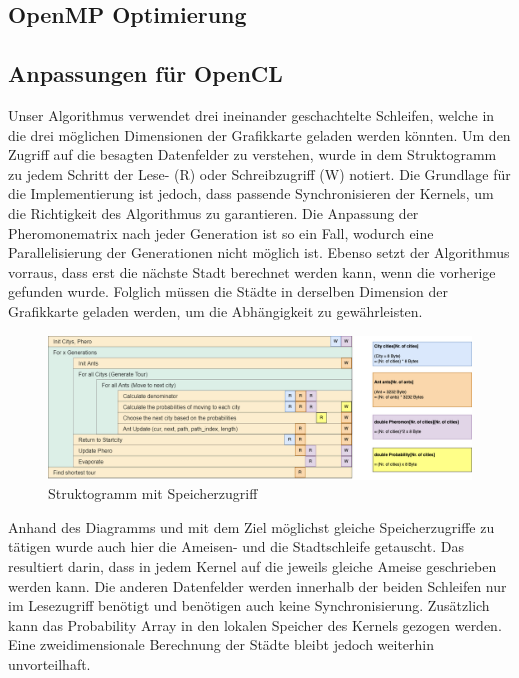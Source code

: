 \subsection*{OpenMP Optimierung}

\subsection*{Anpassungen für OpenCL}

Unser Algorithmus verwendet drei ineinander geschachtelte Schleifen, welche in die drei möglichen Dimensionen der Grafikkarte geladen werden könnten.
Um den Zugriff auf die besagten Datenfelder zu verstehen, wurde in dem Struktogramm zu jedem Schritt der Lese- (R) oder Schreibzugriff (W) notiert.
Die Grundlage für die Implementierung ist jedoch, dass passende Synchronisieren der Kernels, um die Richtigkeit des Algorithmus zu garantieren.
Die Anpassung der Pheromonematrix nach jeder Generation ist so ein Fall, wodurch eine Parallelisierung der Generationen nicht möglich ist.
Ebenso setzt der Algorithmus vorraus, dass erst die nächste Stadt berechnet werden kann, wenn die vorherige gefunden wurde.
Folglich müssen die Städte in derselben Dimension der Grafikkarte geladen werden, um die Abhängigkeit zu gewährleisten.

\begin{figure}[h]
    \centering
    \includegraphics[width=\textwidth]{../images/Speicherzugriff.png}
    \caption{Struktogramm mit Speicherzugriff}
    \label{fig:struktogramm-speicher}
\end{figure}

Anhand des Diagramms und mit dem Ziel möglichst gleiche Speicherzugriffe zu tätigen wurde auch hier die Ameisen- und die Stadtschleife getauscht.
Das resultiert darin, dass in jedem Kernel auf die jeweils gleiche Ameise geschrieben werden kann.
Die anderen Datenfelder werden innerhalb der beiden Schleifen nur im Lesezugriff benötigt und benötigen auch keine Synchronisierung.
Zusätzlich kann das Probability Array in den lokalen Speicher des Kernels gezogen werden.
Eine zweidimensionale Berechnung der Städte bleibt jedoch weiterhin unvorteilhaft.


